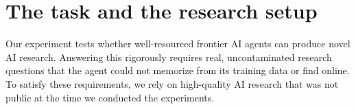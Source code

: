 


\section{The task and the research setup}
\label{sec:setup}

Our experiment tests whether well-resourced frontier AI agents can produce
novel AI research. Answering this rigorously requires real, uncontaminated
research questions that the agent could not memorize from its training data or
find online. To satisfy these requirements, we rely on high-quality AI research that
was not public at the time we conducted the experiments.


